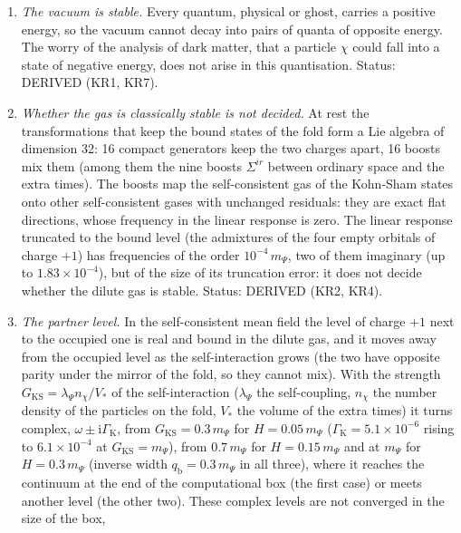 \documentclass[
  10pt,
]{article}
\providecommand{\tightlist}{%
  \setlength{\itemsep}{0pt}\setlength{\parskip}{0pt}}
\begin{document}
\begin{enumerate}
\def\labelenumi{\arabic{enumi}.}
\tightlist
\item
  \emph{The vacuum is stable.} Every quantum, physical or ghost, carries
  a positive energy, so the vacuum cannot decay into pairs of quanta of
  opposite energy. The worry of the analysis of dark matter, that a
  particle \(\chi\) could fall into a state of negative energy, does not
  arise in this quantisation. Status: DERIVED (KR1, KR7).
\item
  \emph{Whether the gas is classically stable is not decided.} At rest
  the transformations that keep the bound states of the fold form a Lie
  algebra of dimension 32: 16 compact generators keep the two charges
  apart, 16 boosts mix them (among them the nine boosts \(\Sigma^{ir}\)
  between ordinary space and the extra times). The boosts map the
  self-consistent gas of the Kohn-Sham states onto other self-consistent
  gases with unchanged residuals: they are exact flat directions, whose
  frequency in the linear response is zero. The linear response
  truncated to the bound level (the admixtures of the four empty
  orbitals of charge \(+1\)) has frequencies of the order
  \(10^{-4}\,m_\Psi\), two of them imaginary (up to
  \(1.83\times10^{-4}\)), but of the size of its truncation error: it
  does not decide whether the dilute gas is stable. Status: DERIVED
  (KR2, KR4).
\item
  \emph{The partner level.} In the self-consistent mean field the level
  of charge \(+1\) next to the occupied one is real and bound in the
  dilute gas, and it moves away from the occupied level as the
  self-interaction grows (the two have opposite parity under the mirror
  of the fold, so they cannot mix). With the strength
  \(G_{\mathrm{KS}} = \lambda_\Psi n_\chi/V_*\) of the self-interaction
  (\(\lambda_\Psi\) the self-coupling, \(n_\chi\) the number density of
  the particles on the fold, \(V_*\) the volume of the extra times) it
  turns complex, \(\omega \pm \mathrm{i}\Gamma_{\mathrm{K}}\), from
  \(G_{\mathrm{KS}} = 0.3\,m_\Psi\) for \(H = 0.05\,m_\Psi\)
  (\(\Gamma_{\mathrm{K}} = 5.1\times10^{-6}\) rising to
  \(6.1\times10^{-4}\) at \(G_{\mathrm{KS}} = m_\Psi\)), from
  \(0.7\,m_\Psi\) for \(H = 0.15\,m_\Psi\) and at \(m_\Psi\) for
  \(H = 0.3\,m_\Psi\) (inverse width \(q_{\mathrm{b}} = 0.3\,m_\Psi\) in
  all three), where it reaches the continuum at the end of the
  computational box (the first case) or meets another level (the other
  two). These complex levels are not converged in the size of the box,

\end{enumerate}
\end{document}
